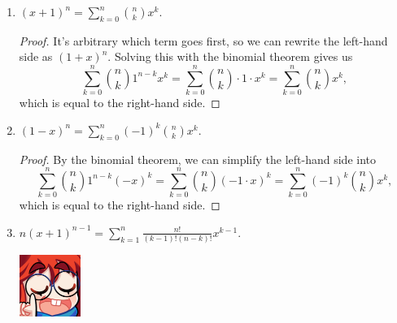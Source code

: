 \documentclass{article}
\begin{document}
\begin{enumerate}
    how the binomial theorem works.\begin{proof} 
        (LHS) Consider a series of $n$ ordered coin flips (i.e.\ heads on only the first flip and heads on only the last flip are distinct from each other, despite having the same number of heads). 
        If we wanted to count the total number of possible outcomes, we could count systematically by segregating the outcomes into $n$ separate outcomes, each corresponding to the amount of heads, starting at 0 heads, then 1 head, all the way
        up to $n$ heads. This can be expressed as\[
            \binom{n}{0} + \binom{n}{1} + \hdots + \binom{n}{n} = \sum_{k=0}^n \binom{n}{k}.    
        \] We add each case because they are all distinct from each other.\par 
        (RHS) Now consider an alternate way of counting ordered coin flips. If we have $n$ flips, each with only 2 possible outcomes, then we simply multiply 2 by itself $n$ times, or $2^n$. This is counting the 
        number of permutations of coin flips given $n$ flips, and thus it is equivalent to the left-hand side. 
    \end{proof} 
    \item $\displaystyle {(x+1)}^n = \sum_{k=0}^{n} \binom{n}{k} x^k$.\begin{proof} 
        It's arbitrary which term goes first, so we can rewrite the left-hand side as ${(1+x)}^n$. Solving this with the binomial theorem gives us\[
            \sum_{k=0}^n \binom{n}{k} 1^{n-k} x^k = \sum_{k=0}^{n} \binom{n}{k} \cdot 1 \cdot x^k = \sum_{k=0}^{n} \binom{n}{k} x^k,
        \] which is equal to the right-hand side. 
    \end{proof} 
    \item $\displaystyle {(1-x)}^n = \sum_{k=0}^{n} {(-1)}^k \binom{n}{k} x^k$.\begin{proof} 
        By the binomial theorem, we can simplify the left-hand side into\[
            \sum_{k=0}^n \binom{n}{k} 1^{n-k} {(-x)}^k = \sum_{k=0}^n \binom{n}{k} {(-1 \cdot x)}^k = \sum_{k=0}^n {(-1)}^k \binom{n}{k} x^k, 
        \] which is equal to the right-hand side. 
    \end{proof} 
    \item $\displaystyle n{(x+1)}^{n-1} = \sum_{k=1}^n \frac{n!}{(k-1)!(n-k)!} x^{k-1}$.\par 
    \begin{minipage}[t]{.14\textwidth}
        \vspace{0pt}
        \includegraphics[width=2cm]{nerd_maddy.png} 

\end{minipage}
\end{enumerate}
\end{document}
